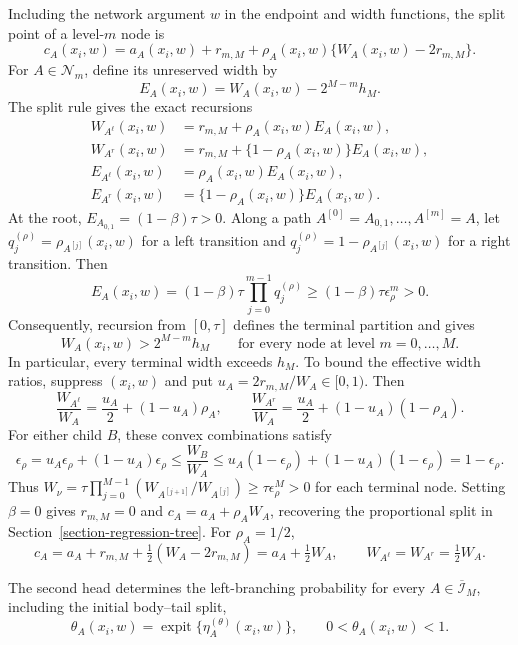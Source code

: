 \documentclass[11pt]{article}
\numberwithin{equation}{section}
\begin{document}
Including the network argument $w$ in the endpoint and width functions, the split point of a level-$m$ node is
\begin{equation}
    c_A(x_i,w)=a_A(x_i,w)+r_{m,M}
      +\rho_A(x_i,w)\{W_A(x_i,w)-2r_{m,M}\}.
    \label{eq:general-tree-cut}
\end{equation}
For $A\in\mathcal N_m$, define its unreserved width by
\[
    E_A(x_i,w)=W_A(x_i,w)-2^{M-m}h_M.
\]
The split rule gives the exact recursions
\begin{align*}
    W_{A^\ell}(x_i,w)&=r_{m,M}+\rho_A(x_i,w)E_A(x_i,w),\\
    W_{A^r}(x_i,w)&=r_{m,M}+\{1-\rho_A(x_i,w)\}E_A(x_i,w),\\
    E_{A^\ell}(x_i,w)&=\rho_A(x_i,w)E_A(x_i,w),\\
    E_{A^r}(x_i,w)&=\{1-\rho_A(x_i,w)\}E_A(x_i,w).
\end{align*}
At the root, $E_{A_{0,1}}=(1-\beta)\tau>0$. Along a path $A^{[0]}=A_{0,1},\ldots,A^{[m]}=A$, let $q_j^{(\rho)}=\rho_{A^{[j]}}(x_i,w)$ for a left transition and $q_j^{(\rho)}=1-\rho_{A^{[j]}}(x_i,w)$ for a right transition. Then
\[
    E_A(x_i,w)=(1-\beta)\tau\prod_{j=0}^{m-1}q_j^{(\rho)}
       \geq(1-\beta)\tau\epsilon_\rho^m>0.
\]
Consequently, recursion from $[0,\tau]$ defines the terminal partition and gives
\begin{equation}
    W_A(x_i,w)>2^{M-m}h_M
    \qquad\text{for every node at level }m=0,\ldots,M.
    \label{eq:reservation-invariant}
\end{equation}
In particular, every terminal width exceeds $h_M$. To bound the effective width ratios, suppress $(x_i,w)$ and put $u_A=2r_{m,M}/W_A\in[0,1)$. Then
\[
    \frac{W_{A^\ell}}{W_A}=\frac{u_A}{2}+(1-u_A)\rho_A,
    \qquad
    \frac{W_{A^r}}{W_A}=\frac{u_A}{2}+(1-u_A)(1-\rho_A).
\]
For either child $B$, these convex combinations satisfy
\[
    \epsilon_\rho
    =u_A\epsilon_\rho+(1-u_A)\epsilon_\rho
    \leq\frac{W_B}{W_A}
    \leq u_A(1-\epsilon_\rho)+(1-u_A)(1-\epsilon_\rho)
    =1-\epsilon_\rho.
\]
Thus $W_\nu=\tau\prod_{j=0}^{M-1}(W_{A^{[j+1]}}/W_{A^{[j]}})\geq\tau\epsilon_\rho^M>0$ for each terminal node. Setting $\beta=0$ gives $r_{m,M}=0$ and $c_A=a_A+\rho_AW_A$, recovering the proportional split in Section~\ref{section-regression-tree}. For $\rho_A=1/2$,
\[
    c_A=a_A+r_{m,M}+\tfrac12(W_A-2r_{m,M})
       =a_A+\tfrac12W_A,\qquad
    W_{A^\ell}=W_{A^r}=\tfrac12W_A.
\]

The second head determines the left-branching probability for every $A\in\overline{\mathcal I}_M$, including the initial body--tail split,
\begin{equation}
    \label{eq:branch_prob}
    \theta_A(x_i,w)
    =
    \operatorname{expit}\{\eta_A^{(\theta)}(x_i,w)\},
    \qquad 0<\theta_A(x_i,w)<1.
\end{equation}
\end{document}
